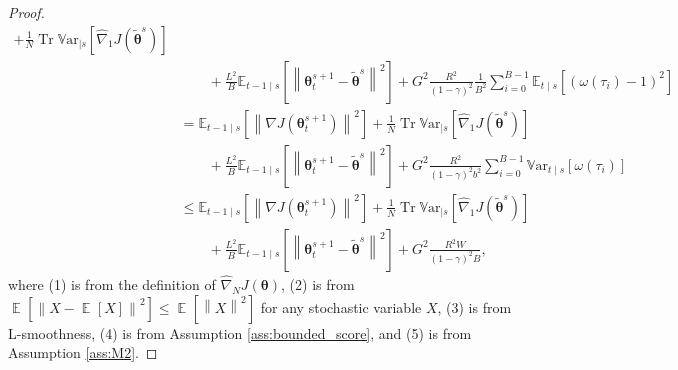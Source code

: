 \documentclass{article}
\theoremstyle{remark}
\theoremstyle{definition}
\DeclareMathOperator*{\EV}{\mathbb{E}}
\DeclareMathOperator{\Tr}{Tr}
\newcommand{\EVV}[2][\ppvect \in \ppspace]{\EV_{#1}\left[{#2}\right]}
\newcommand{\norm}[2][\infty]{\left\|#2\right\|_{#1}}
\newcommand{\vtheta}{\boldsymbol{\theta}}
\newcommand{\gradJ}[1]{\nabla J(#1)}
\newcommand{\gradApp}[2]{\hat{\nabla}_{#2}J(#1)}
\newcommand{\Ets}[2][t]{\mathbb{E}_{#1\mid s}\left[#2\right]}
\newcommand{\Varts}[2][t]{{\mathbb{V}\text{ar}}_{#1\mid s}\left[#2\right]}
\begin{document}
\begin{proof}
\begin{align}
	+\frac{1}{N}\Tr\Varts[]{\gradApp{\tilde{\vtheta}^s}{1}}
	\nonumber\\
	&\qquad+\frac{L^2}{B}\Ets[t-1]{\norm[]{\vtheta_t^{s+1}-\tilde{\vtheta}^s}^2}
	+G^2\frac{R^2}{(1-\gamma)^2}\frac{1}{B^2}\sum_{i=0}^{B-1}\Ets{(\omega(\tau_i)-1)^2} \\
	&= \Ets[t-1]{\norm[]{\gradJ{\vtheta_t^{s+1}}}^2} 
	+\frac{1}{N}\Tr\Varts[]{\gradApp{\tilde{\vtheta}^s}{1}}
	\nonumber\\
	&\qquad+\frac{L^2}{B}\Ets[t-1]{\norm[]{\vtheta_t^{s+1}-\tilde{\vtheta}^s}^2}
	+G^2\frac{R^2}{(1-\gamma)^2b^2}\sum_{i=0}^{B-1}\Varts{\omega(\tau_i)} \nonumber\\
	&\leq \Ets[t-1]{\norm[]{\gradJ{\vtheta_t^{s+1}}}^2} 
	+\frac{1}{N}\Tr\Varts[]{\gradApp{\tilde{\vtheta}^s}{1}}
	\nonumber\\
	&\qquad+\frac{L^2}{B}\Ets[t-1]{\norm[]{\vtheta_t^{s+1}-\tilde{\vtheta}^s}^2}
	+G^2\frac{R^2W}{(1-\gamma)^2B},
\end{align}
where (1) is from the definition of $\gradApp{\vtheta}{N}$, (2) is from $\EVV[]{\norm[]{X-\EVV[]{X}}^2}\leq\EVV[]{\norm[]{X}^2}$ for any stochastic variable $X$, (3) is from L-smoothness, 
(4) is from Assumption \ref{ass:bounded_score}, and (5) is from Assumption \ref{ass:M2}.
\end{proof}
\end{document}
